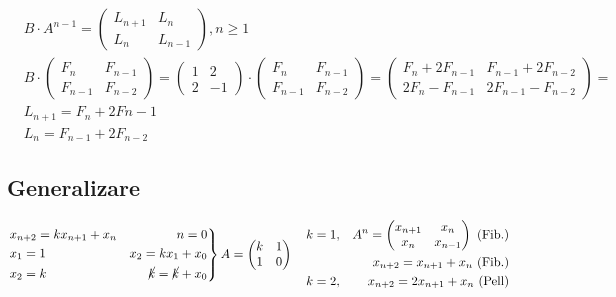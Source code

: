 \documentclass[12pt]{article}
\theoremstyle{definition}
\begin{document}
\[\begin{aligned}
&B \cdot A^{n-1} = \begin{pmatrix}
L_{n+1}&L_n\\
L_n&L_{n-1}
\end{pmatrix}, n \geq 1\\
&B\cdot\begin{pmatrix}
F_n&F_{n-1}\\
F_{n-1}&F_{n-2}
\end{pmatrix}= \begin{pmatrix}
1&2\\
2&-1
\end{pmatrix}\cdot\begin{pmatrix}
F_n&F_{n-1}\\
F_{n-1}&F_{n-2}
\end{pmatrix}=\begin{pmatrix}
F_{n}+2F_{n-1}&F_{n-1}+2F_{n-2}\\
2F_n-F_{n-1}&2F_{n-1}-F_{n-2}
\end{pmatrix}=\\
&L_{n+1}=F_{n}+2F{n-1}\\
&\boxed{L_n=F_{n-1}+2F_{n-2}}
\end{aligned}\]

\subsection*{Generalizare}
\[\left. \begin{aligned}
&x_{n+2} = k x_{n+1}+x_n & n=0\\
&x_1=1 & x_2=k x_1 + x_0\\
&x_2=k & \cancel{k} = \cancel{k} + x_0 
\end{aligned}\right\} A = \begin{pmatrix}
k&1\\
1&0
\end{pmatrix} \ \ \ \begin{aligned} &k=1, &A^n=\begin{pmatrix}
x_{n+1}&x_n\\
x_n&x_{n-1}
\end{pmatrix} \ \text{(Fib.)}\\
&&x_{n+2}=x_{n+1}+x_n \  \text{(Fib.)}\\
&k=2, &x_{n+2}=2x_{n+1}+x_n \ \text{(Pell)}
\end{aligned}\]
\end{document}
